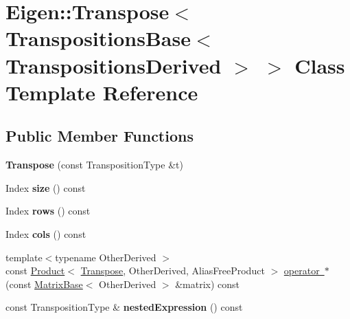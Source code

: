\hypertarget{class_eigen_1_1_transpose_3_01_transpositions_base_3_01_transpositions_derived_01_4_01_4}{}\section{Eigen\+::Transpose$<$ Transpositions\+Base$<$ Transpositions\+Derived $>$ $>$ Class Template Reference}
\label{class_eigen_1_1_transpose_3_01_transpositions_base_3_01_transpositions_derived_01_4_01_4}
\subsection*{Public Member Functions}
\begin{DoxyCompactItemize}
\item 
\mbox{\label{class_eigen_1_1_transpose_3_01_transpositions_base_3_01_transpositions_derived_01_4_01_4_a889982c74c9f28938fa03c82f7ff87d2}} 
{\bfseries Transpose} (const Transposition\+Type \&t)
\item 
\mbox{\label{class_eigen_1_1_transpose_3_01_transpositions_base_3_01_transpositions_derived_01_4_01_4_aac6ec07520b1bc9354a81e0aacffb39b}} 
Index {\bfseries size} () const
\item 
\mbox{\label{class_eigen_1_1_transpose_3_01_transpositions_base_3_01_transpositions_derived_01_4_01_4_ac225e11ad1604cd750063aab9332e211}} 
Index {\bfseries rows} () const
\item 
\mbox{\label{class_eigen_1_1_transpose_3_01_transpositions_base_3_01_transpositions_derived_01_4_01_4_a158f9b2ba450e4b2b5965e864b87c853}} 
Index {\bfseries cols} () const
\item 
{\footnotesize template$<$typename Other\+Derived $>$ }\\const \mbox{\hyperlink{class_eigen_1_1_product}{Product}}$<$ \mbox{\hyperlink{class_eigen_1_1_transpose}{Transpose}}, Other\+Derived, Alias\+Free\+Product $>$ \mbox{\hyperlink{class_eigen_1_1_transpose_3_01_transpositions_base_3_01_transpositions_derived_01_4_01_4_a812f9c34b587a81b57b088d9828312db}{operator $\ast$}} (const \mbox{\hyperlink{class_eigen_1_1_matrix_base}{Matrix\+Base}}$<$ Other\+Derived $>$ \&matrix) const
\item 
\mbox{\label{class_eigen_1_1_transpose_3_01_transpositions_base_3_01_transpositions_derived_01_4_01_4_ae1561da690d9dc1133bcce0dba061910}} 
const Transposition\+Type \& {\bfseries nested\+Expression} () const
\end{DoxyCompactItemize}
